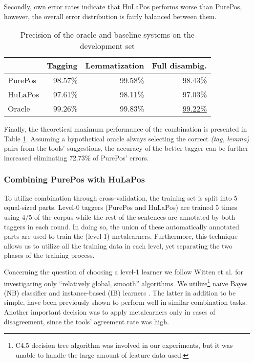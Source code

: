 Secondly, own error rates indicate that HuLaPos performs worse than PurePos, however, the overall error distribution is fairly balanced between them. 

\begin{table}[h]
\centering
\caption{Precision of the oracle and baseline systems on the development set}\label{tab:comb-disambig-acc}
\begin{tabular}{l r r r}
\hline
& Tagging & Lemmatization & Full disambig. \\
\hline
PurePos & 98.57\% & 99.58\% & 98.43\% \\
HuLaPos & 97.61\% & 98.11\% & 97.03\% \\
Oracle & 99.26\% & 99.83\% & \underline{99.22\%} \\
\hline
\end{tabular}
\end{table}

Finally, the theoretical maximum performance of the combination is presented in Table \ref{tab:comb-disambig-acc}.
Assuming a hypothetical oracle always selecting the correct \emph{(tag, lemma)} pairs from the tools' suggestions, the accuracy of the better tagger can be further increased eliminating 72.73\% of PurePos' errors. 

\subsubsection{Combining PurePos with HuLaPos}

To utilize combination through cross-validation, the training set is split into 5 equal-sized parts.
Level-0 taggers (PurePos and HuLaPos) are trained 5 times using 4/5 of the corpus while the rest of the sentences are annotated by both taggers in each round.
In doing so, the union of these automatically annotated parts are used to train the (level-1) metalearners.
Furthermore, this technique allows us to utilize all the training data in each level, yet separating the two phases of the training process. 

Concerning the question of choosing a level-1 learner we follow Witten et al. \cite{Witten2011} for investigating only ``relatively global, smooth'' algorithms.
We utilize\footnote{ C4.5 decision tree algorithm was involved in our experiments, but it was unable to handle the large amount of feature data used.} naïve Bayes (NB) classifier and instance-based (IB) learners \cite{Aha1991}.
The latter in addition to be simple, have been previously shown to perform well in similar combination tasks.
Another important decision was to apply metalearners only in cases of disagreement, since the tools’ agreement rate was high.

